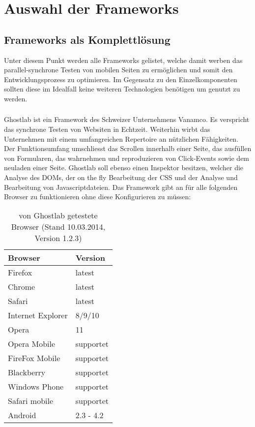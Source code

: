 \chapter{Auswahl der Frameworks}

\section{Frameworks als Komplettlösung}
Unter diesem Punkt werden alle Frameworks gelistet, welche damit werben das parallel-synchrone Testen von mobilen Seiten zu ermöglichen und somit den Entwicklungsprozess zu optimieren. Im Gegensatz zu den Einzelkomponenten sollten diese im Idealfall keine weiteren Technologien benötigen um genutzt zu werden.
	\subsection{}
	Ghostlab ist ein Framework des Schweizer Unternehmens Vanamco. Es verspricht das synchrone Testen von Websiten in 		Echtzeit. Weiterhin wirbt das Unternehmen mit einem umfangreichen Repertoire an nützlichen Fähigkeiten. Der 				Funktionsumfang umschliesst das Scrollen innerhalb einer Seite, das ausfüllen von  Formularen, das wahrnehmen und 			reproduzieren von Click-Events sowie dem neuladen einer Seite. Ghostlab soll ebenso einen Inspektor besitzen, welcher die 		Analyse des DOMs, der on the fly Bearbeitung der CSS und der Analyse und Bearbeitung von Javascriptdateien. Das 			Framework gibt an für alle folgenden Browser zu funktionieren ohne diese Konfigurieren zu müssen:

	\begin{table}[H]
 		\centering
			\begin{tabular}{| p{5cm} | p{5cm} |}
			
			\hline
				Browser 	& 	Version\\
			\hline
			\hline
				Firefox	&	latest\\
				Chrome	&	latest\\
				Safari	&	latest\\
				Internet Explorer	&	8/9/10\\
				Opera	&	11\\
				Opera Mobile	&	supportet\\
				FireFox Mobile	&	supportet\\
				Blackberry	&	supportet\\
				Windows Phone	&	supportet\\
				Safari mobile	&	supportet\\	
				Android	&	2.3 - 4.2\\
				\hline
				\end{tabular}
			\caption{von Ghostlab getestete Browser (Stand 10.03.2014, Version 1.2.3)}
	\end{table}

